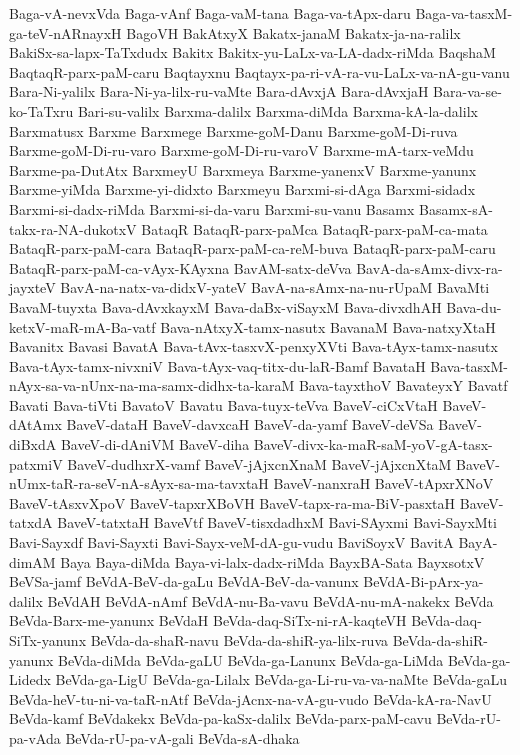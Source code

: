 {Baga-vA-nevxVda
Baga-vAnf
Baga-vaM-tana
Baga-va-tApx-daru
Baga-va-tasxM-ga-teV-nARnayxH
BagoVH
BakAtxyX
Bakatx-janaM
Bakatx-ja-na-ralilx
BakiSx-sa-lapx-TaTxdudx
Bakitx
Bakitx-yu-LaLx-va-LA-dadx-riMda
BaqshaM
BaqtaqR-parx-paM-caru
Baqtayxnu
Baqtayx-pa-ri-vA-ra-vu-LaLx-va-nA-gu-vanu
Bara-Ni-yalilx
Bara-Ni-ya-lilx-ru-vaMte
Bara-dAvxjA
Bara-dAvxjaH
Bara-va-se-ko-TaTxru
Bari-su-valilx
Barxma-dalilx
Barxma-diMda
Barxma-kA-la-dalilx
Barxmatusx
Barxme
Barxmege
Barxme-goM-Danu
Barxme-goM-Di-ruva
Barxme-goM-Di-ru-varo
Barxme-goM-Di-ru-varoV
Barxme-mA-tarx-veMdu
Barxme-pa-DutAtx
BarxmeyU
Barxmeya
Barxme-yanenxV
Barxme-yanunx
Barxme-yiMda
Barxme-yi-didxto
Barxmeyu
Barxmi-si-dAga
Barxmi-sidadx
Barxmi-si-dadx-riMda
Barxmi-si-da-varu
Barxmi-su-vanu
Basamx
Basamx-sA-takx-ra-NA-dukotxV
BataqR
BataqR-parx-paMca
BataqR-parx-paM-ca-mata
BataqR-parx-paM-cara
BataqR-parx-paM-ca-reM-buva
BataqR-parx-paM-caru
BataqR-parx-paM-ca-vAyx-KAyxna
BavAM-satx-deVva
BavA-da-sAmx-divx-ra-jayxteV
BavA-na-natx-va-didxV-yateV
BavA-na-sAmx-na-nu-rUpaM
BavaMti
BavaM-tuyxta
Bava-dAvxkayxM
Bava-daBx-viSayxM
Bava-divxdhAH
Bava-du-ketxV-maR-mA-Ba-vatf
Bava-nAtxyX-tamx-nasutx
BavanaM
Bava-natxyXtaH
Bavanitx
Bavasi
BavatA
Bava-tAvx-tasxvX-penxyXVti
Bava-tAyx-tamx-nasutx
Bava-tAyx-tamx-nivxniV
Bava-tAyx-vaq-titx-du-laR-Bamf
BavataH
Bava-tasxM-nAyx-sa-va-nUnx-na-ma-samx-didhx-ta-karaM
Bava-tayxthoV
BavateyxY
Bavatf
Bavati
Bava-tiVti
BavatoV
Bavatu
Bava-tuyx-teVva
BaveV-ciCxVtaH
BaveV-dAtAmx
BaveV-dataH
BaveV-davxcaH
BaveV-da-yamf
BaveV-deVSa
BaveV-diBxdA
BaveV-di-dAniVM
BaveV-diha
BaveV-divx-ka-maR-saM-yoV-gA-tasx-patxmiV
BaveV-dudhxrX-vamf
BaveV-jAjxcnXnaM
BaveV-jAjxcnXtaM
BaveV-nUmx-taR-ra-seV-nA-sAyx-sa-ma-tavxtaH
BaveV-nanxraH
BaveV-tApxrXNoV
BaveV-tAsxvXpoV
BaveV-tapxrXBoVH
BaveV-tapx-ra-ma-BiV-pasxtaH
BaveV-tatxdA
BaveV-tatxtaH
BaveVtf
BaveV-tisxdadhxM
Bavi-SAyxmi
Bavi-SayxMti
Bavi-Sayxdf
Bavi-Sayxti
Bavi-Sayx-veM-dA-gu-vudu
BaviSoyxV
BavitA
BayA-dimAM
Baya
Baya-diMda
Baya-vi-lalx-dadx-riMda
BayxBA-Sata
BayxsotxV
BeVSa-jamf
BeVdA-BeV-da-gaLu
BeVdA-BeV-da-vanunx
BeVdA-Bi-pArx-ya-dalilx
BeVdAH
BeVdA-nAmf
BeVdA-nu-Ba-vavu
BeVdA-nu-mA-nakekx
BeVda
BeVda-Barx-me-yanunx
BeVdaH
BeVda-daq-SiTx-ni-rA-kaqteVH
BeVda-daq-SiTx-yanunx
BeVda-da-shaR-navu
BeVda-da-shiR-ya-lilx-ruva
BeVda-da-shiR-yanunx
BeVda-diMda
BeVda-gaLU
BeVda-ga-Lanunx
BeVda-ga-LiMda
BeVda-ga-Lidedx
BeVda-ga-LigU
BeVda-ga-Lilalx
BeVda-ga-Li-ru-va-va-naMte
BeVda-gaLu
BeVda-heV-tu-ni-va-taR-nAtf
BeVda-jAcnx-na-vA-gu-vudo
BeVda-kA-ra-NavU
BeVda-kamf
BeVdakekx
BeVda-pa-kaSx-dalilx
BeVda-parx-paM-cavu
BeVda-rU-pa-vAda
BeVda-rU-pa-vA-gali
BeVda-sA-dhaka
}
